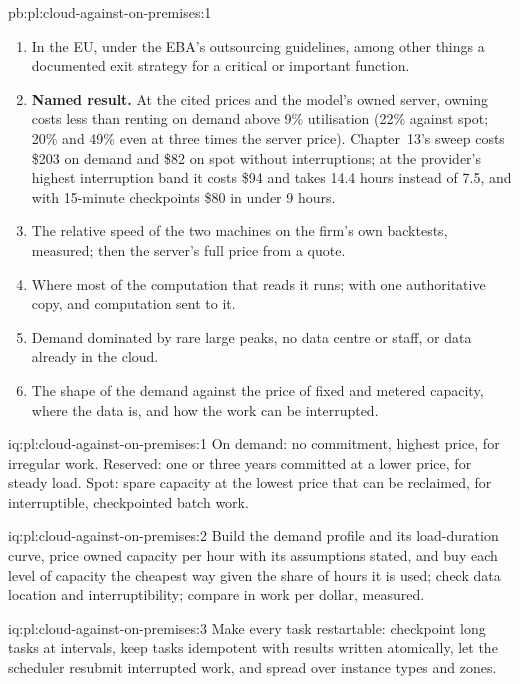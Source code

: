\begin{solution}{pb:pl:cloud-against-on-premises:1}
\begin{enumerate}
\item In the EU, under the EBA's outsourcing guidelines, among other things a documented exit strategy for a critical or important function.
\item \textbf{Named result.} At the cited prices and the model's owned server, owning costs less than renting on demand above 9\% utilisation
(22\% against spot; 20\% and 49\% even at three times the server price). Chapter~13's sweep costs \$203 on demand and \$82 on spot without
interruptions; at the provider's highest interruption band it costs \$94 and takes 14.4 hours instead of 7.5, and with 15-minute checkpoints
\$80 in under 9 hours.
\item The relative speed of the two machines on the firm's own backtests, measured; then the server's full price from a quote.
\item Where most of the computation that reads it runs; with one authoritative copy, and computation sent to it.
\item Demand dominated by rare large peaks, no data centre or staff, or data already in the cloud.
\item The shape of the demand against the price of fixed and metered capacity, where the data is, and how the work can be interrupted.
\end{enumerate}
\end{solution}

\begin{solution}{iq:pl:cloud-against-on-premises:1}
On demand: no commitment, highest price, for irregular work. Reserved: one or three years committed at a lower price, for steady load. Spot:
spare capacity at the lowest price that can be reclaimed, for interruptible, checkpointed batch work.
\end{solution}

\begin{solution}{iq:pl:cloud-against-on-premises:2}
Build the demand profile and its load-duration curve, price owned capacity per hour with its assumptions stated, and buy each level of capacity
the cheapest way given the share of hours it is used; check data location and interruptibility; compare in work per dollar, measured.
\end{solution}

\begin{solution}{iq:pl:cloud-against-on-premises:3}
Make every task restartable: checkpoint long tasks at intervals, keep tasks idempotent with results written atomically, let the scheduler
resubmit interrupted work, and spread over instance types and zones.
\end{solution}

